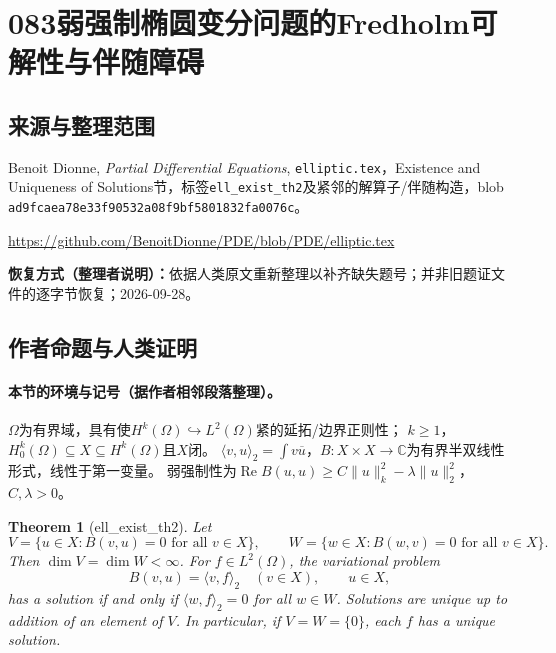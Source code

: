 \documentclass[UTF8,11pt]{ctexart}
\newtheorem*{theorem}{Theorem}
\theoremstyle{definition}
\begin{document}
\section*{083\quad 弱强制椭圆变分问题的Fredholm可解性与伴随障碍}
\subsection*{来源与整理范围}
Benoit Dionne, \emph{Partial Differential Equations}, \texttt{elliptic.tex}，Existence and Uniqueness of Solutions节，标签\texttt{ell\_exist\_th2}及紧邻的解算子/伴随构造，blob \nolinkurl{ad9fcaea78e33f90532a08f9bf5801832fa0076c}。
\par\url{https://github.com/BenoitDionne/PDE/blob/PDE/elliptic.tex}
\par\textbf{恢复方式（整理者说明）：}依据人类原文重新整理以补齐缺失题号；并非旧题证文件的逐字节恢复；2026-09-28。
\subsection*{作者命题与人类证明}

\paragraph{本节的环境与记号（据作者相邻段落整理）。}
$\Omega$为有界域，具有使$H^k(\Omega)\hookrightarrow L^2(\Omega)$紧的延拓/边界正则性；
$k\geq1$，$H^k_0(\Omega)\subseteq X\subseteq H^k(\Omega)$且$X$闭。
$\langle v,u\rangle_2=\int v\overline u$，$B:X\times X\to\mathbb C$为有界半双线性形式，线性于第一变量。
弱强制性为$\operatorname{Re}B(u,u)\geq C\|u\|_k^2-\lambda\|u\|_2^2$，$C,\lambda>0$。
\begin{theorem}[ell\_exist\_th2]
Let
\[
V=\{u\in X:B(v,u)=0\text{ for all }v\in X\},\qquad
W=\{w\in X:B(w,v)=0\text{ for all }v\in X\}.
\]
Then $\dim V=\dim W<\infty$. For $f\in L^2(\Omega)$, the variational
problem
\[
B(v,u)=\langle v,f\rangle_2\quad(v\in X),\qquad u\in X,
\]
has a solution if and only if $\langle w,f\rangle_2=0$ for all $w\in W$.
Solutions are unique up to addition of an element of $V$.
In particular, if $V=W=\{0\}$, each $f$ has a unique solution.
\end{theorem}
\end{document}

